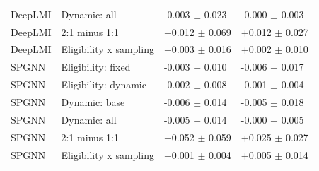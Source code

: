 {\begin{longtable}{llll}
DeepLMI & Dynamic: all & -0.003 $\pm$ 0.023 & -0.000 $\pm$ 0.003 \\
DeepLMI & 2:1 minus 1:1 & +0.012 $\pm$ 0.069 & +0.012 $\pm$ 0.027 \\
DeepLMI & Eligibility x sampling & +0.003 $\pm$ 0.016 & +0.002 $\pm$ 0.010 \\
SPGNN & Eligibility: fixed & -0.003 $\pm$ 0.010 & -0.006 $\pm$ 0.017 \\
SPGNN & Eligibility: dynamic & -0.002 $\pm$ 0.008 & -0.001 $\pm$ 0.004 \\
SPGNN & Dynamic: base & -0.006 $\pm$ 0.014 & -0.005 $\pm$ 0.018 \\
SPGNN & Dynamic: all & -0.005 $\pm$ 0.014 & -0.000 $\pm$ 0.005 \\
SPGNN & 2:1 minus 1:1 & +0.052 $\pm$ 0.059 & +0.025 $\pm$ 0.027 \\
SPGNN & Eligibility x sampling & +0.001 $\pm$ 0.004 & +0.005 $\pm$ 0.014 \\
\end{longtable}
}
